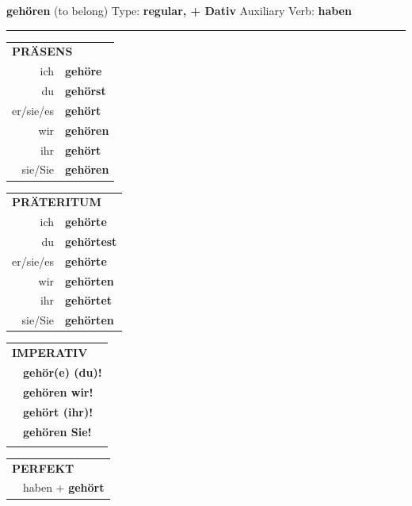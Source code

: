 \documentclass[10pt,a4paper]{revtex4-2}
\begin{document}
\begin{verbbox-dat}
    {\Large \bf gehören} (to belong) \hfill Type: \textbf{regular, + Dativ} \hfill Auxiliary Verb: \textbf{haben} 
    
     \vspace{5pt}

    \hrule
    
    \vspace{5pt}

  \begin{tabular}{rl}
     \multicolumn{2}{l}{\textbf{PRÄSENS} }\\
    ich & \textbf{gehöre}\\
    du & \textbf{gehörst}\\
    er/sie/es & \textbf{gehört}\\
    wir & \textbf{gehören}\\
    ihr & \textbf{gehört}\\
    sie/Sie & \textbf{gehören}\\
  \end{tabular}
  \hfill
     \begin{tabular}{rl}
    \multicolumn{2}{l}{\textbf{PRÄTERITUM} }\\
    ich & \textbf{gehörte}\\
    du & \textbf{gehörtest}\\
    er/sie/es & \textbf{gehörte}\\
    wir & \textbf{gehörten}\\
    ihr & \textbf{gehörtet}\\
    sie/Sie & \textbf{gehörten}\\
  \end{tabular}
  \hfill
  \begin{tabular}{rl}
     \multicolumn{2}{l}{\textbf{IMPERATIV} }\\
   & \textbf{gehör(e) (du)!}\\
   & \textbf{gehören wir!}\\
   & \textbf{gehört (ihr)!}\\
   & \textbf{gehören Sie!}\\
   & \vspace{10pt}
  \end{tabular}

    \vspace{10pt}

 \begin{tabular}{rl}
     \multicolumn{2}{l}{\textbf{PERFEKT}}\\
  &  haben + \textbf{gehört}\\
  \end{tabular}
\hfill
   \begin{tabular}{rl}
   

\end{tabular}
\end{verbbox-dat}
\end{document}
